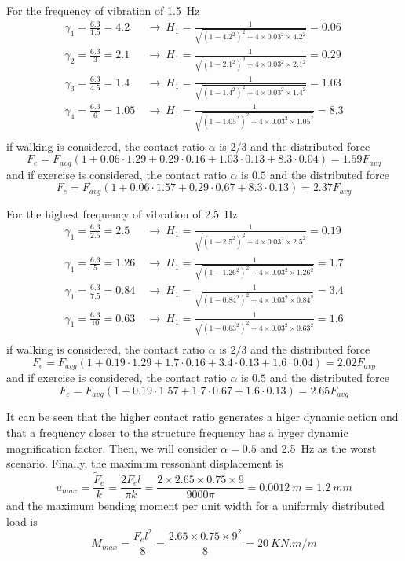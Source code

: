 \begin{Answer}[ref={footfall_analysis}]
For the frequency of vibration of \qty{1.5}{Hz}
\begin{align*}
\gamma_1 = \frac{6.3}{1.5} = 4.2\ &\rightarrow\ H_1 = \frac{1}{\sqrt{(1-4.2^2)^2 + 4\times0.03^2\times4.2^2}} = 0.06\\
\gamma_2 = \frac{6.3}{3}   = 2.1\ &\rightarrow\ H_1 = \frac{1}{\sqrt{(1-2.1^2)^2 + 4\times0.03^2\times2.1^2}} = 0.29\\
\gamma_3 = \frac{6.3}{4.5} = 1.4\ &\rightarrow\ H_1 = \frac{1}{\sqrt{(1-1.4^2)^2 + 4\times0.03^2\times1.4^2}} = 1.03\\
\gamma_4 = \frac{6.3}{6}   = 1.05\ &\rightarrow\ H_1 = \frac{1}{\sqrt{(1-1.05^2)^2 + 4\times0.03^2\times1.05^2}} = 8.3\\
\end{align*}
if walking is considered, the contact ratio $\alpha$ is $2/3$ and the distributed force
$$
F_e = F_{avg} (1 + 0.06\cdot1.29 + 0.29\cdot0.16 + 1.03\cdot0.13 + 8.3\cdot0.04) = 1.59F_{avg}
$$
and if exercise is considered, the contact ratio $\alpha$ is $0.5$ and the distributed force
$$
F_e = F_{avg} (1 + 0.06\cdot1.57 + 0.29\cdot0.67 + 8.3\cdot0.13) = 2.37F_{avg}
$$

For the highest frequency of vibration of \qty{2.5}{Hz}
\begin{align*}
\gamma_1 = \frac{6.3}{2.5} = 2.5\ &\rightarrow\ H_1 = \frac{1}{\sqrt{(1-2.5^2)^2 + 4\times0.03^2\times2.5^2}} = 0.19\\
\gamma_1 = \frac{6.3}{5} = 1.26\ &\rightarrow\ H_1 = \frac{1}{\sqrt{(1-1.26^2)^2 + 4\times0.03^2\times1.26^2}} = 1.7\\
\gamma_1 = \frac{6.3}{7.5} = 0.84\ &\rightarrow\ H_1 = \frac{1}{\sqrt{(1-0.84^2)^2 + 4\times0.03^2\times0.84^2}} = 3.4\\
\gamma_1 = \frac{6.3}{10} = 0.63\ &\rightarrow\ H_1 = \frac{1}{\sqrt{(1-0.63^2)^2 + 4\times0.03^2\times0.63^2}} = 1.6\\
\end{align*}
if walking is considered, the contact ratio $\alpha$ is $2/3$ and the distributed force
$$
F_e = F_{avg} (1 + 0.19\cdot1.29 + 1.7\cdot0.16 + 3.4\cdot0.13 + 1.6\cdot0.04) = 2.02F_{avg}
$$
and if exercise is considered, the contact ratio $\alpha$ is $0.5$ and the distributed force
$$
F_e = F_{avg} (1 + 0.19\cdot1.57 + 1.7\cdot0.67 + 1.6\cdot0.13) = 2.65F_{avg}
$$

It can be seen that the higher contact ratio generates a higer dynamic action and that a frequency closer to the structure frequency has a hyger dynamic magnification factor. Then, we will consider $\alpha=0.5$ and \qty{2.5}{Hz} as the worst scenario.
Finally, the maximum ressonant displacement is
$$
u_{max} = \frac{\tilde{F}_e}{k} = \frac{2F_el}{\pi k} = \frac{2\times2.65\times0.75\times9}{9000\pi} = \SI{0.0012}{m} = \SI{1.2}{mm}
$$
and the maximum bending moment per unit width for a uniformly distributed load is
$$
M_{max} = \frac{F_el^2}{8} = \frac{2.65\times0.75\times9^2}{8} = \SI{20}{KN.m/m}
$$



\end{Answer}
